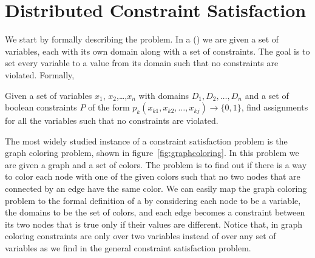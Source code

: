 \section{Distributed Constraint Satisfaction}
\label{sec:dcs}

We start by formally describing the problem. In a  () we are given a set of
variables, each with its own domain along with a set of constraints.
The goal is to set every variable to a value from its domain such that
no constraints are violated. Formally,

\begin{definition}
  Given a set of variables $x_1$, $x_2$,\ldots,$x_n$ with domains $D_1,
  D_2,\ldots,D_n$ and a set of boolean constraints $P$ of the form
  $p_k (x_{k1}, x_{k2}, \ldots , x_{kj}) \rightarrow \{0,1\}$, find
  assignments for all the variables such that no constraints are
  violated.
\end{definition}


\begin{SCfigure}
  \begin{minipage}{1.0\linewidth}
  \begin{center}
  \end{center}
  \end{minipage}
  \caption{Sample graph coloring problem. You must color each node
    either black, white, or gray so that no two nodes connected by an
    edge have the same color. Can you find a coloring?}
  \label{fig:graphcoloring}
\end{SCfigure}

The most widely studied instance of a constraint satisfaction problem
is the graph coloring problem, shown in
figure~\ref{fig:graphcoloring}.  In this problem we are given a graph
and a set of colors. The problem is to find out if there is a way to
color each node with one of the given colors such that no two nodes
that are connected by an edge have the same color.  We can easily map
the graph coloring problem to the formal definition of a  by
considering each node to be a variable, the domains to be the set of
colors, and each edge becomes a constraint between its two nodes that
is true only if their values are different.  Notice that, in graph
coloring constraints are only over two variables instead of over any
set of variables as we find in the general constraint satisfaction
problem.

